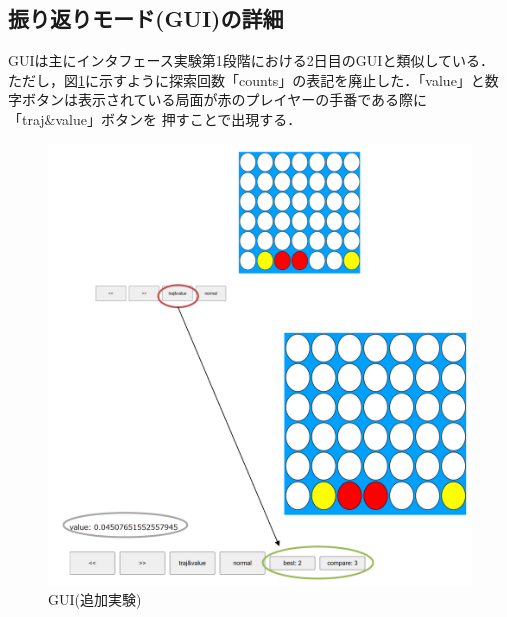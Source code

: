 \subsection{振り返りモード(GUI)の詳細}
GUIは主にインタフェース実験第1段階における2日目のGUIと類似している．
ただし，図\ref{fig:extra}に示すように探索回数「counts」の表記を廃止した．「value」と数字ボタンは表示されている局面が赤のプレイヤーの手番である際に「traj\&value」ボタンを
押すことで出現する．
\begin{figure}[htbp]
	\centering
    \includegraphics[width=\linewidth]{./figure/extra.png}
	\caption{GUI(追加実験)}
	\label{fig:extra}
\end{figure}

